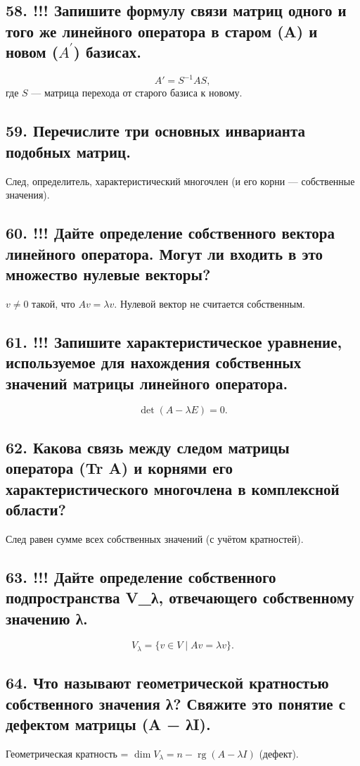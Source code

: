 \documentclass[a4paper,12pt]{article}
\newcommand{\rg}{\operatorname{rg}}
\begin{document}
\subsection*{58. !!! Запишите формулу связи матриц одного и того же линейного оператора в старом (A) и новом ($A^'$) базисах.}
\[ A' = S^{-1} A S, \] где \(S\) — матрица перехода от старого базиса к новому.

\subsection*{59. Перечислите три основных инварианта подобных матриц.}
След, определитель, характеристический многочлен (и его корни — собственные значения).

\subsection*{60. !!! Дайте определение собственного вектора линейного оператора. Могут ли входить в это множество нулевые векторы?}
\(v \ne 0\) такой, что \(A v = \lambda v\). Нулевой вектор не считается собственным.

\subsection*{61. !!! Запишите характеристическое уравнение, используемое для нахождения собственных значений матрицы линейного оператора.}
\[ \det(A - \lambda E) = 0. \]

\subsection*{62. Какова связь между следом матрицы оператора (Tr A) и корнями его характеристического многочлена в комплексной области?}
След равен сумме всех собственных значений (с учётом кратностей).

\subsection*{63. !!! Дайте определение собственного подпространства V_λ, отвечающего собственному значению λ.}
\[ V_\lambda = \{ v \in V \mid A v = \lambda v \}. \]

\subsection*{64. Что называют геометрической кратностью собственного значения λ? Свяжите это понятие с дефектом матрицы (A − λI).}
Геометрическая кратность = \(\dim V_\lambda = n - \rg(A - \lambda I)\) (дефект).
\end{document}
